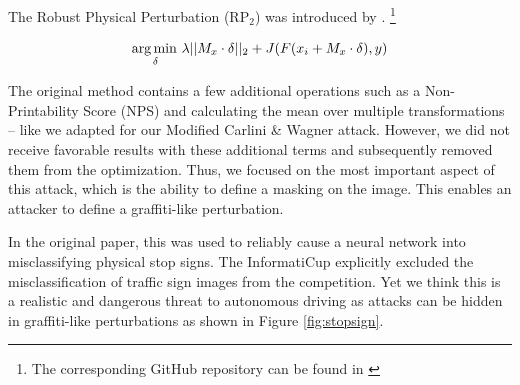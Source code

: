 The Robust Physical Perturbation (RP$_2$) was introduced by \citet{eykholt2018robust}.
\footnote{The corresponding GitHub repository can be found in \cite{rp2repo}}

\begin{equation}
\operatorname*{arg\,min\,}_\delta \lambda ||M_x \cdot \delta||_2 + J(F(x_i + M_x \cdot \delta), y)
\end{equation}

The original method contains a few additional operations such as a Non-Printability Score (NPS) and calculating the mean over multiple transformations -- like we adapted for our Modified Carlini \& Wagner attack.
However, we did not receive favorable results with these additional terms and subsequently removed them from the optimization.
Thus, we focused on the most important aspect of this attack, which is the ability to define a masking on the image.
This enables an attacker to define a graffiti-like perturbation.

In the original paper, this was used to reliably cause a neural network into misclassifying physical stop signs.
The InformatiCup explicitly excluded the misclassification of traffic sign images from the competition.
Yet we think this is a realistic and dangerous threat to autonomous driving as attacks can be hidden in graffiti-like perturbations as shown in Figure \ref{fig:stopsign}.

